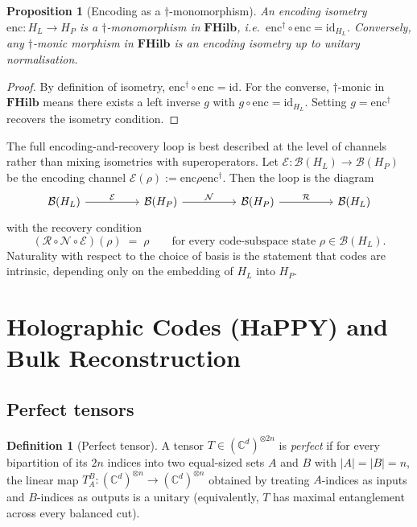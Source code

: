 \documentclass[12pt]{article}
\newtheorem{proposition}[theorem]{Proposition}
\theoremstyle{definition}
\newtheorem{definition}[theorem]{Definition}
\theoremstyle{remark}
\newcommand{\FHilb}{\mathbf{FHilb}}
\newcommand{\enc}{\mathrm{enc}}
\newcommand{\id}{\mathrm{id}}
\begin{document}
\begin{proposition}[Encoding as a $\dagger$-monomorphism]
\label{prop:enc-monomorphism}
An encoding isometry $\enc\colon H_L \to H_P$ is a $\dagger$-monomorphism in $\FHilb$, i.e.\ $\enc^\dagger \circ \enc = \id_{H_L}$. Conversely, any $\dagger$-monic morphism in $\FHilb$ is an encoding isometry up to unitary normalisation.
\end{proposition}

\begin{proof}
By definition of isometry, $\enc^\dagger \circ \enc = \id$. For the converse, $\dagger$-monic in $\FHilb$ means there exists a left inverse $g$ with $g \circ \enc = \id_{H_L}$. Setting $g = \enc^\dagger$ recovers the isometry condition.
\end{proof}

The full encoding-and-recovery loop is best described at the level of channels rather than mixing isometries with superoperators. Let $\mathcal{E}\colon \mathcal{B}(H_L) \to \mathcal{B}(H_P)$ be the encoding channel $\mathcal{E}(\rho) := \enc \rho \enc^\dagger$. Then the loop is the diagram
\begin{equation}
\label{eq:qec-loop}
\begin{tikzcd}[column sep=huge]
\mathcal{B}(H_L) \arrow[r,"\mathcal{E}"] & \mathcal{B}(H_P) \arrow[r,"\mathcal{N}"] & \mathcal{B}(H_P) \arrow[r,"\mathcal{R}"] & \mathcal{B}(H_L)
\end{tikzcd}
\end{equation}
with the recovery condition
\[
(\mathcal{R} \circ \mathcal{N} \circ \mathcal{E})(\rho) \;=\; \rho \qquad \text{for every code-subspace state } \rho \in \mathcal{B}(H_L).
\]
Naturality with respect to the choice of basis is the statement that codes are intrinsic, depending only on the embedding of $H_L$ into $H_P$.

\section{Holographic Codes (HaPPY) and Bulk Reconstruction}
\label{sec:happy}

\subsection{Perfect tensors}

\begin{definition}[Perfect tensor]
\label{def:perfect}
A tensor $T \in (\mathbb{C}^d)^{\otimes 2n}$ is \emph{perfect} if for every bipartition of its $2n$ indices into two equal-sized sets $A$ and $B$ with $|A| = |B| = n$, the linear map $T_A^B\colon (\mathbb{C}^d)^{\otimes n} \to (\mathbb{C}^d)^{\otimes n}$ obtained by treating $A$-indices as inputs and $B$-indices as outputs is a unitary (equivalently, $T$ has maximal entanglement across every balanced cut).
\end{definition}
\end{document}
